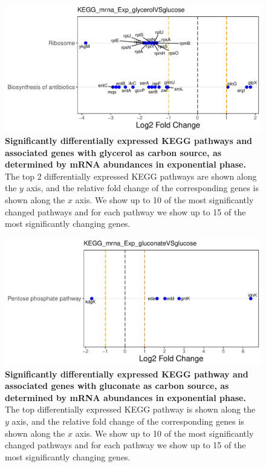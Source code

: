 \documentclass[a4paper]{article}
\begin{document}
\clearpage

\begin{figure}[!htb]
	\includegraphics[width=1.0\textwidth]{../../d_figures/KEGG01_mrna_Exp_glycerolVSglucose_withTitle.pdf}
	\caption[Significantly differentially expressed KEGG pathways for mRNA samples in exponential phase tested for glycerol against glucose]
	{\textbf{Significantly differentially expressed KEGG pathways and associated genes with glycerol as carbon source, as determined by mRNA abundances in exponential phase.} The top 2 differentially expressed KEGG pathways are shown along the $y$ axis, and the relative fold change of the corresponding genes is shown along the $x$ axis. We show up to 10 of the most significantly changed pathways and for each pathway we show up to 15 of the most significantly changing genes.}
\end{figure}

\clearpage
\begin{figure}
	\includegraphics[width=1.0\textwidth]{../../d_figures/KEGG02_mrna_Exp_gluconateVSglucose_withTitle.pdf}
	\caption[Significantly differentially expressed KEGG pathways for mRNA samples in exponential phase tested for gluconate against glucose]
	{\textbf{Significantly differentially expressed KEGG pathway and associated genes with gluconate as carbon source, as determined by mRNA abundances in exponential phase.} The top differentially expressed KEGG pathway is shown along the $y$ axis, and the relative fold change of the corresponding genes is shown along the $x$ axis. We show up to 10 of the most significantly changed pathways and for each pathway we show up to 15 of the most significantly changing genes.}
\end{figure}
\end{document}
